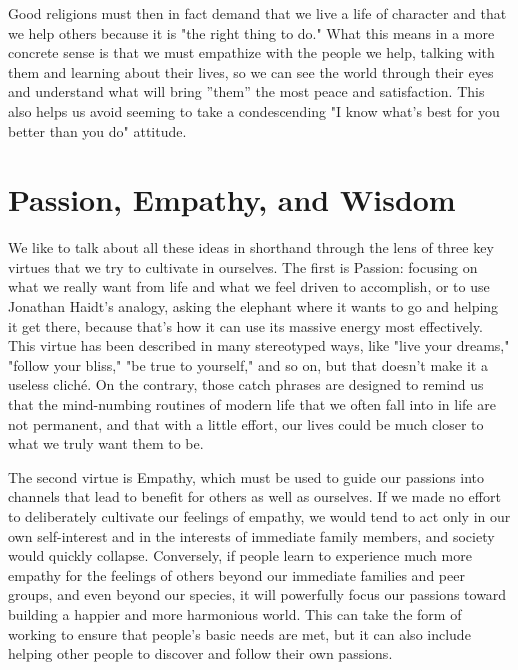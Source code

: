 \documentclass[ebook,12pt,openany,twoside]{memoir}
\begin{document}
Good religions must then in fact demand that we live a life of character and
that we help others because it is "the right thing to do." What this means in a
more concrete sense is that we must empathize with the people we help, talking
with them and learning about their lives, so we can see the world through their
eyes and understand what will bring ''them'' the most peace and satisfaction.
This also helps us avoid seeming to take a condescending "I know what's best
for you better than you do" attitude.

\chapter{Passion, Empathy, and Wisdom}

We like to talk about all these ideas in shorthand through the lens of three
key virtues that we try to cultivate in ourselves. The first is Passion:
focusing on what we really want from life and what we feel driven to
accomplish, or to use Jonathan Haidt's analogy, asking the elephant where it
wants to go and helping it get there, because that's how it can use its massive
energy most effectively. This virtue has been described in many stereotyped
ways, like "live your dreams," "follow your bliss," "be true to yourself," and
so on, but that doesn't make it a useless cliché. On the contrary, those catch
phrases are designed to remind us that the mind-numbing routines of modern life
that we often fall into in life are not permanent, and that with a little
effort, our lives could be much closer to what we truly want them to be.

The second virtue is Empathy, which must be used to guide our passions into
channels that lead to benefit for others as well as ourselves. If we made no
effort to deliberately cultivate our feelings of empathy, we would tend to act
only in our own self-interest and in the interests of immediate family members,
and society would quickly collapse. Conversely, if people learn to experience
much more empathy for the feelings of others beyond our immediate families and
peer groups, and even beyond our species, it will powerfully focus our passions
toward building a happier and more harmonious world. This can take the form of
working to ensure that people's basic needs are met, but it can also include
helping other people to discover and follow their own passions.
\end{document}

